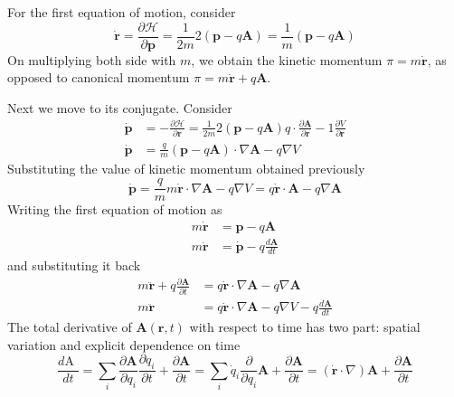 \documentclass[../../../main.tex]{subfiles}
\begin{document}
For the first equation of motion, consider
\begin{equation*}
	\dot{\mathbf{r }}=\frac{\partial \mathcal{H }}{\partial \mathbf{p }}=\frac{1 }{2m }2 \left( \mathbf{p } -q \mathbf{A }	\right)=\frac{1 }{m }\left( \mathbf{p }-q \mathbf{A } \right)
\end{equation*}
On multiplying both side with $m$, we obtain the kinetic momentum $\pi =m \dot{\mathbf{r }}$, as opposed to canonical momentum $\pi=m \dot{\mathbf{r }}+q \mathbf{A}$.

Next we move to its conjugate.
Consider
\begin{align*}
	\dot{\mathbf{p }} & =-\frac{\partial \mathcal{ H }}{\partial \mathbf{r }}=\frac{1 }{2m }2 \left( \mathbf{p }-q \mathbf{A } \right) q \cdot  \frac{\partial \mathbf{A 		}}{\partial \mathbf{r }	}-1 \frac{\partial V }{\partial \mathbf{r }} \\
	\dot{\mathbf{p }} & =\frac{q }{m}\left( \mathbf{p } -q \mathbf{A }	\right)\cdot \nabla \mathbf{A } -q \nabla V
\end{align*}
Substituting the value of kinetic momentum obtained previously
\begin{equation*}
	\dot{\mathbf{p }}=\frac{q }{m }m \dot{\mathbf{r }}\cdot \nabla \mathbf{A }-q \nabla V=q \dot{\mathbf{r }}\cdot \mathbf{A }	-q \nabla \mathbf{A }
\end{equation*}
Writing the first equation of motion as
\begin{align*}
	m \dot{\mathbf{r }}  & =\mathbf{p}-q \mathbf{A }                      \\
	m \ddot{\mathbf{r }} & = \dot{\mathbf{p }}-q \frac{d\mathbf{A }}{d t}
\end{align*}
and substituting it back
\begin{align*}
	m \ddot{\mathbf{r }}+q \frac{\partial \mathbf{A }}{\partial t } & =  q \dot{\mathbf{r }}\cdot \nabla \mathbf{A }-q \nabla \mathbf{A }                  \\
	m \ddot{\mathbf{r }}                                            & =q \dot{\mathbf{r }}\cdot \nabla \mathbf{A } -q \nabla V -q \frac{d \mathbf{A }}{dt}
\end{align*}
The total derivative of $\mathbf{A}(\mathbf{r },t)$ with respect to time has two part: spatial variation and explicit dependence on time
\begin{equation*}
	\frac{d\mbox{A }}{dt}=\sum_i \frac{\partial \mathbf{A }}{\partial q_i}\frac{\partial q_i }{\partial t }+\frac{\partial \mathbf{A }}{\partial t }=\sum_i \dot{q}_i \frac{\partial }{\partial q_i }\mathbf{A}+ \frac{\partial \mathbf{A }}{\partial t }= \left( \dot{\mathbf{r }}\cdot \nabla\right)\mathbf{A}+ \frac{\partial \mathbf{A }}{\partial t}
\end{equation*}
\end{document}

